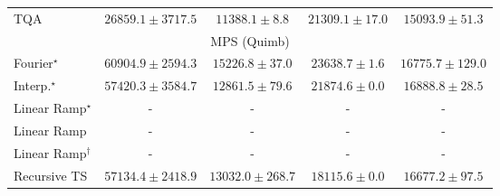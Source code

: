 \begin{tabular}{l|cccc|}
TQA & {\cellcolor[HTML]{B2CAE1}} \color[HTML]{000000} $26859.1\pm 3717.5$ & {\cellcolor[HTML]{F3F9FC}} \color[HTML]{000000} $11388.1\pm 8.8$ & {\cellcolor[HTML]{CCDDEC}} \color[HTML]{000000} $21309.1\pm 17.0$ & {\cellcolor[HTML]{E7F1F7}} \color[HTML]{000000} $15093.9\pm 51.3$ \\
\cline{1-5}
\multicolumn{5}{c}{\rule{0pt}{8pt}MPS (Quimb)} \\
\midrule
Fourier$^\star$ & {\cellcolor[HTML]{8B3005}} \color[HTML]{F1F1F1} $60904.9\pm 2594.3$ & {\cellcolor[HTML]{FFF9C7}} \color[HTML]{000000} $15226.8\pm 37.0$ & {\cellcolor[HTML]{FEE595}} \color[HTML]{000000} $23638.7\pm 1.6$ & {\cellcolor[HTML]{FFF7BE}} \color[HTML]{000000} $16775.7\pm 129.0$ \\
Interp.$^\star$ & {\cellcolor[HTML]{A43904}} \color[HTML]{F1F1F1} $57420.3\pm 3584.7$ & {\cellcolor[HTML]{FFFCD6}} \color[HTML]{000000} $12861.5\pm 79.6$ & {\cellcolor[HTML]{FEEAA0}} \color[HTML]{000000} $21874.6\pm 0.0$ & {\cellcolor[HTML]{FFF7BE}} \color[HTML]{000000} $16888.8\pm 28.5$ \\
Linear Ramp$^\star$ & {\cellcolor[HTML]{000000}} \color[HTML]{F1F1F1} {\cellcolor{white}} \color{black} - & {\cellcolor[HTML]{000000}} \color[HTML]{F1F1F1} {\cellcolor{white}} \color{black} - & {\cellcolor[HTML]{000000}} \color[HTML]{F1F1F1} {\cellcolor{white}} \color{black} - & {\cellcolor[HTML]{000000}} \color[HTML]{F1F1F1} {\cellcolor{white}} \color{black} - \\
Linear Ramp & {\cellcolor[HTML]{000000}} \color[HTML]{F1F1F1} {\cellcolor{white}} \color{black} - & {\cellcolor[HTML]{000000}} \color[HTML]{F1F1F1} {\cellcolor{white}} \color{black} - & {\cellcolor[HTML]{000000}} \color[HTML]{F1F1F1} {\cellcolor{white}} \color{black} - & {\cellcolor[HTML]{000000}} \color[HTML]{F1F1F1} {\cellcolor{white}} \color{black} - \\
Linear Ramp$^\dagger$ & {\cellcolor[HTML]{000000}} \color[HTML]{F1F1F1} {\cellcolor{white}} \color{black} - & {\cellcolor[HTML]{000000}} \color[HTML]{F1F1F1} {\cellcolor{white}} \color{black} - & {\cellcolor[HTML]{000000}} \color[HTML]{F1F1F1} {\cellcolor{white}} \color{black} - & {\cellcolor[HTML]{000000}} \color[HTML]{F1F1F1} {\cellcolor{white}} \color{black} - \\
Recursive TS & {\cellcolor[HTML]{A63A03}} \color[HTML]{F1F1F1} $57134.4\pm 2418.9$ & {\cellcolor[HTML]{FFFCD4}} \color[HTML]{000000} $13032.0\pm 268.7$ & {\cellcolor[HTML]{FFF4B6}} \color[HTML]{000000} $18115.6\pm 0.0$ & {\cellcolor[HTML]{FFF8C0}} \color[HTML]{000000} $16677.2\pm 97.5$ \\

\end{tabular}
